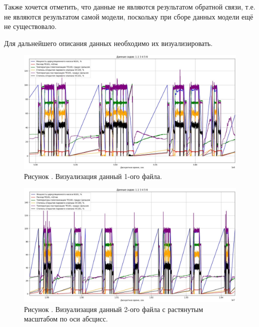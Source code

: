 {  \par \redline Также хочется отметить, что данные не являются результатом обратной связи, т.е. не являются результатом самой модели, поскольку при сборе данных модели ещё не существовало.

  \par \redline Для дальнейшего описания данных необходимо их визуализировать. 

  \begin{figure}
    \centering
    \def\svgwidth{\textwidth}
    \includegraphics[scale=0.6]{images/data_1_visual.jpg}
    \caption*{\gostFont Рисунок \thechaptercntr .\theimagecntr \spc {--} Визуализация данный 1-ого файла.}
    \label{fig:NNBlackBox}
  \end{figure} \addtocounter{imagecntr}{1}

  \begin{figure}
    \centering
    \def\svgwidth{\textwidth}
    \includegraphics[scale=0.6]{images/data_2_visual.jpg}
    \caption*{\gostFont Рисунок \thechaptercntr .\theimagecntr \spc {--} Визуализация данный 2-ого файла с растянутым масштабом по оси абсцисс.}
    \label{fig:NNBlackBox}
  \end{figure} \addtocounter{imagecntr}{1}

}
